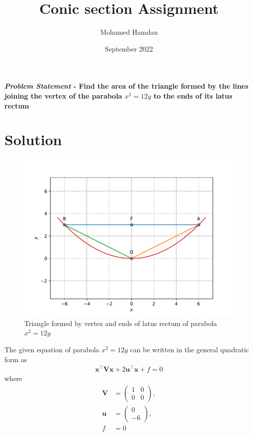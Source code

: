 \documentclass[journal,10pt,twocolumn]{article}
\title{\textbf{Conic section Assignment}}
\author{Mohamed Hamdan}
\date{September 2022}
\let\vec\mathbf
\newcommand{\myvec}[1]{\ensuremath{\begin{pmatrix}#1\end{pmatrix}}}
\begin{document}
\maketitle
\paragraph{\textit{Problem Statement} - Find the area of the triangle formed by the lines joining the vertex of the parabola $x^2 = 12y$ to the ends of its latus rectum}

\section*{\large Solution}

\begin{figure}[h]
\centering
\includegraphics[width=1\columnwidth]{figs/fig1.pdf}
\caption{Triangle formed by vertex and ends of latus rectum of parabola $x^2 = 12y$}
\label{fig:parabola}
\end{figure}

The given equation of parabola $x^2 = 12y$ can be written in the general quadratic form as
\begin{align}
    \label{eq:conic_quad_form}
    \vec{x}^{\top}\vec{V}\vec{x}+2\vec{u}^{\top}\vec{x}+f=0
    \end{align}
where
\begin{align}
	\label{eq:V_matrix}
	\vec{V} &= \myvec{1 & 0\\0 & 0},
	\\
	\label{eq:u_vector}
	\vec{u} &= \myvec{0\\-6},
	\\
	\label{eq:f_value}
	f &= 0
\end{align}
\end{document}
